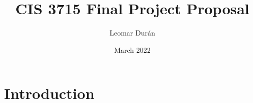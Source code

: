 \documentclass[11pt]{article}
\title{CIS 3715 Final Project Proposal}
\author{Leomar Durán}
\date{March 2022}
\begin{document}
\maketitle

\section{Introduction}
\end{document}
